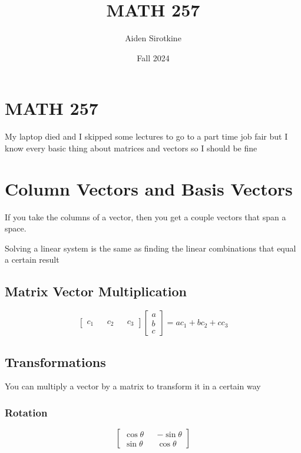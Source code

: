 \documentclass[fleqn]{report}
\date{Fall 2024}
\title{MATH 257}
\author{Aiden Sirotkine}
\begin{document}
\pagestyle{fancy}
\maketitle
\tableofcontents
\clearpage

\chapter{MATH 257}
My laptop died and I skipped some lectures to go to a part time 
job fair but I know every basic thing about matrices and vectors 
so I should be fine 

\chapter{Column Vectors and Basis Vectors} 
If you take the columns of a vector, then you get a couple vectors 
that span a space.

Solving a linear system is the same as finding the linear combinations 
that equal a certain result

\section{Matrix Vector Multiplication}
\[
\begin{bmatrix}
    c_1 && c_2 && c_3
\end{bmatrix}
\begin{bmatrix} a \\ b \\ c \end{bmatrix} =
a c_1 + b c_2 + c c_3
\]

\section{Transformations}
You can multiply a vector by a matrix to transform it in a certain 
way

\subsection{Rotation}
\[
\begin{bmatrix}
\cos \theta && - \sin \theta \\
\sin \theta && \cos \theta
\end{bmatrix}
\]
\end{document}
